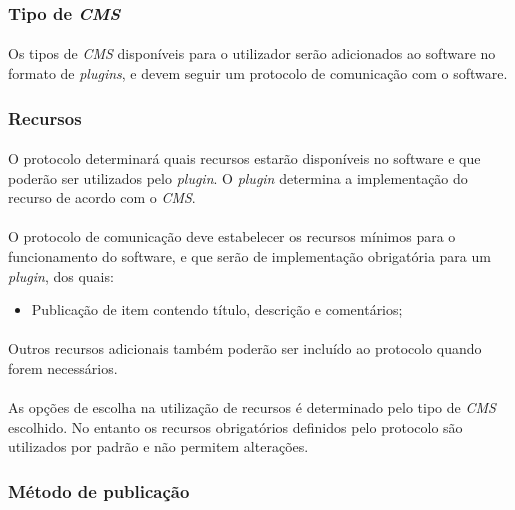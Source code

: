 \documentclass[a4paper,12pt]{article}
\def\cms{\emph{CMS}}
\def\plugin{\emph{plugin}}
\begin{document}
\subsubsection{Tipo de \cms{}}

\paragraph{}
Os tipos de \cms{} disponíveis para o utilizador serão adicionados ao software no formato de \emph{plugins}, e devem seguir um protocolo de comunicação com o software.

\subsubsection{Recursos}

\paragraph{}
O protocolo determinará quais recursos estarão disponíveis no software e que poderão ser utilizados pelo \plugin{}. O \plugin{} determina a implementação do recurso de acordo com o \cms{}.
\paragraph{}
O protocolo de comunicação deve estabelecer os recursos mínimos para o funcionamento do software, e que serão de implementação obrigatória para um \plugin{}, dos quais:

\begin{itemize}
\item Publicação de item contendo título, descrição e comentários;
\end{itemize}

\paragraph{}
Outros recursos adicionais também poderão ser incluído ao protocolo quando forem necessários.

\paragraph{}
As opções de escolha na utilização de recursos é determinado pelo tipo de \cms{} escolhido. No entanto os recursos obrigatórios definidos pelo protocolo são utilizados por padrão e não permitem alterações.

\subsubsection{Método de publicação}
\end{document}
